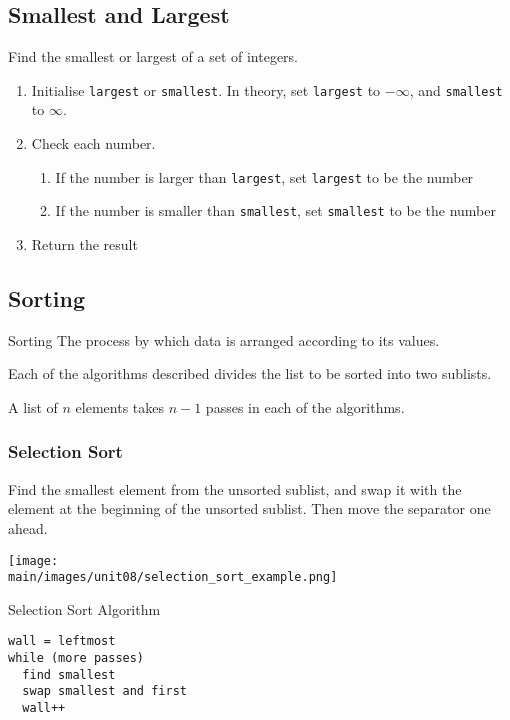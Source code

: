 \documentclass[\main/notes.tex]{subfiles}
\begin{document}
			\subsection{Smallest and Largest}
				Find the smallest or largest of a set of integers.
				\begin{enumerate}[nosep]
					\item Initialise \texttt{largest} or \texttt{smallest}. In theory, set \texttt{largest} to $-\infty$, and \texttt{smallest} to $\infty$.
					\item Check each number.
						\begin{enumerate}
							\item If the number is larger than \texttt{largest}, set \texttt{largest} to be the number
							\item If the number is smaller than \texttt{smallest}, set \texttt{smallest} to be the number
						\end{enumerate}
					\item Return the result
				\end{enumerate}
			\subsection{Sorting}
				\begin{definition}{Sorting}
					The process by which data is arranged according to its values.
				\end{definition}
				Each of the algorithms described divides the list to be sorted into two sublists.

				A list of $n$ elements takes $n - 1$ passes in each of the algorithms.
				\subsubsection{Selection Sort}
					Find the smallest element from the unsorted sublist, and swap it with the element at the beginning of the unsorted sublist. Then move the separator one ahead.
					\begin{center}
						\texttt{[image: \\main/images/unit08/selection\_sort\_example.png]}
					\end{center}
					\begin{sidenote}{Selection Sort Algorithm}
						\begin{lstlisting}
wall = leftmost
while (more passes)
  find smallest
  swap smallest and first
  wall++
						\end{lstlisting}
					\end{sidenote}
				\pagebreak
\end{document}
